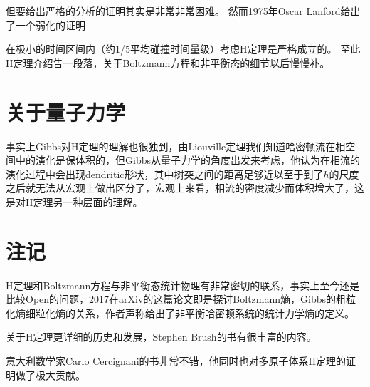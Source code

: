 但要给出严格的分析的证明其实是非常非常困难。
然而1975年Oscar Lanford给出了一个弱化的证明\cite{4}

在极小的时间区间内（约1/5平均碰撞时间量级）考虑H定理是严格成立的。
至此H定理介绍告一段落，关于Boltzmann方程和非平衡态的细节以后慢慢补。

\section{关于量子力学}
事实上Gibbs对H定理的理解也很独到，由Liouville定理我们知道哈密顿流在相空间中的演化是保体积的，但Gibbs从量子力学的角度出发来考虑，他认为在相流的演化过程中会出现dendritic形状，其中树突之间的距离足够近以至于到了$h$的尺度之后就无法从宏观上做出区分了，宏观上来看，相流的密度减少而体积增大了，这是对H定理另一种层面的理解。

\section{注记}
H定理和Boltzmann方程与非平衡态统计物理有非常密切的联系，事实上至今还是比较Open的问题，2017在arXiv的这篇论文即是探讨Boltzmann熵，Gibbs的粗粒化熵细粒化熵的关系，作者声称给出了非平衡哈密顿系统的统计力学熵的定义。\cite{5}

关于H定理更详细的历史和发展，Stephen Brush的书有很丰富的内容\cite{6}。

意大利数学家Carlo Cercignani的书非常不错，他同时也对多原子体系H定理的证明做了极大贡献\cite{7}。
